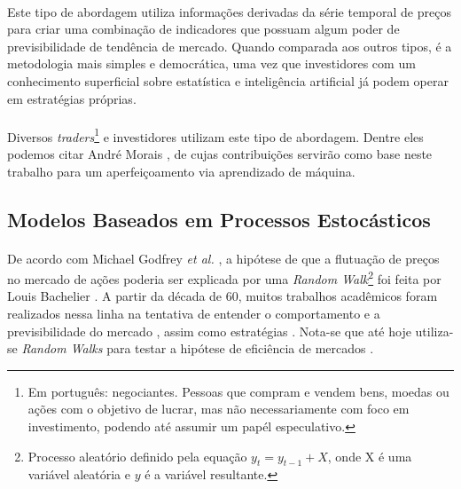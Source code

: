 \paragraph{} Este tipo de abordagem utiliza informações derivadas da série temporal de preços para criar uma combinação de indicadores que possuam algum poder de previsibilidade de tendência de mercado. Quando comparada aos outros tipos, é a metodologia mais simples e democrática, uma vez que investidores com um conhecimento superficial sobre estatística e inteligência artificial já podem operar em estratégias próprias.

\paragraph{} Diversos \textit{traders}\footnote{Em português: negociantes. Pessoas que compram e vendem bens, moedas ou ações com o objetivo de lucrar, mas não necessariamente com foco em investimento, podendo até assumir um papél especulativo.} e investidores utilizam este tipo de abordagem. Dentre eles podemos citar André Morais \cite{moraes2007se}, de cujas contribuições servirão como base neste trabalho para um aperfeiçoamento via aprendizado de máquina.



\FloatBarrier
\subsection{Modelos Baseados em Processos Estocásticos}

\paragraph{} De acordo com Michael Godfrey \textit{et al.} \cite{godfrey1964random}, a hipótese de que a flutuação de preços no mercado de ações poderia ser explicada por uma \textit{Random Walk}\footnote{Processo aleatório definido pela equação \begin{math}y_t = y_{t-1} + X\end{math}, onde X é uma variável aleatória e \(y\) é a variável resultante.} foi feita por Louis Bachelier \cite{bachelier1900theorie}. A partir da década de 60, muitos trabalhos acadêmicos foram realizados nessa linha na tentativa de entender o comportamento e a previsibilidade do mercado \cite{fama1970efficient, solnik1973note, cooper1982world}, assim como estratégias \cite{malkiel2019random}. Nota-se que até hoje utiliza-se \textit{Random Walks} para testar a hipótese de eficiência de mercados \cite{said2015efficiency}.

